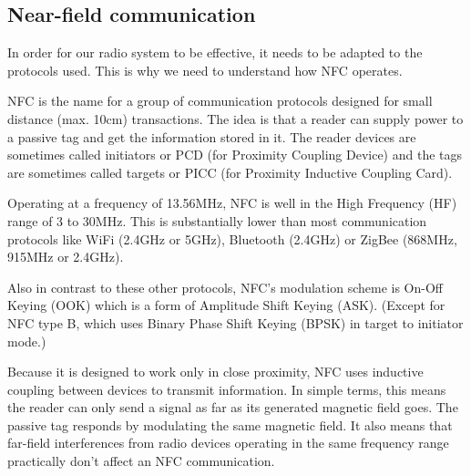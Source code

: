 \subsection{Near-field communication} \label{nfc}

In order for our radio system to be effective, it needs to be adapted to the protocols used. This is why we need to understand how NFC operates.

NFC is the name for a group of communication protocols designed for small distance (max. 10cm) transactions. The idea is that a reader can supply power to a passive tag and get the information stored in it. The reader devices are sometimes called initiators or PCD (for Proximity Coupling Device) and the tags are sometimes called targets or PICC (for Proximity Inductive Coupling Card).

Operating at a frequency of 13.56MHz, NFC is well in the High Frequency (HF) range of 3 to 30MHz. This is substantially lower than most communication protocols like WiFi (2.4GHz or 5GHz), Bluetooth (2.4GHz) or ZigBee (868MHz, 915MHz or 2.4GHz).

Also in contrast to these other protocols, NFC's modulation scheme is On-Off Keying (OOK) which is a form of Amplitude Shift Keying (ASK). (Except for NFC type B, which uses Binary Phase Shift Keying (BPSK) in target to initiator mode.)

Because it is designed to work only in close proximity, NFC uses inductive coupling between devices to transmit information. In simple terms, this means the reader can only send a signal as far as its generated magnetic field goes. The passive tag responds by modulating the same magnetic field. It also means that far-field interferences from radio devices operating in the same frequency range practically don't affect an NFC communication. \cite{wiki_near-field_2020}
